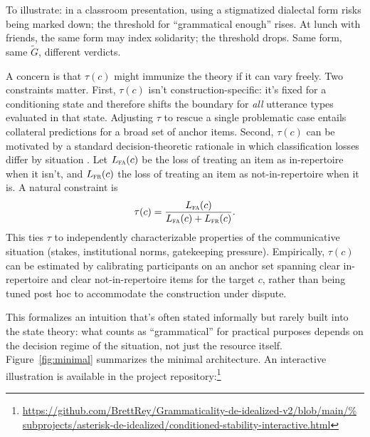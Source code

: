 \documentclass[12pt,letterpaper]{article}
\begin{document}
To illustrate: in a classroom presentation, using a stigmatized dialectal form risks being marked down; the threshold for \enquote{grammatical enough} rises. At lunch with friends, the same form may index solidarity; the threshold drops. Same form, same $\widetilde{G}$, different verdicts.

A concern is that $\tau(c)$ might immunize the theory if it can vary freely. Two constraints matter. First, $\tau(c)$ isn't construction-specific: it's fixed for a conditioning state and therefore shifts the boundary for \emph{all} utterance types evaluated in that state. Adjusting $\tau$ to rescue a single problematic case entails collateral predictions for a broad set of anchor items. Second, $\tau(c)$ can be motivated by a standard decision-theoretic rationale in which classification losses differ by situation \autocite{greenswets1966}. Let $L_{\textsc{fa}}(c)$ be the loss of treating an item as in-repertoire when it isn't, and $L_{\textsc{fr}}(c)$ the loss of treating an item as not-in-repertoire when it is. A natural constraint is
\[
\tau(c)=\frac{L_{\textsc{fa}}(c)}{L_{\textsc{fa}}(c)+L_{\textsc{fr}}(c)}.
\]
This ties $\tau$ to independently characterizable properties of the communicative situation (stakes, institutional norms, gatekeeping pressure). Empirically, $\tau(c)$ can be estimated by calibrating participants on an anchor set spanning clear in-repertoire and clear not-in-repertoire items for the target $c$, rather than being tuned post hoc to accommodate the construction under dispute.

This formalizes an intuition that's often stated informally but rarely built into the state theory:
what counts as \enquote{grammatical} for practical purposes depends on the decision regime of
the situation, not just the resource itself. Figure~\ref{fig:minimal} summarizes the minimal
architecture. An interactive illustration is available in the project repository:\footnote{%
\url{https://github.com/BrettRey/Grammaticality-de-idealized-v2/blob/main/%
subprojects/asterisk-de-idealized/conditioned-stability-interactive.html}}
\end{document}
